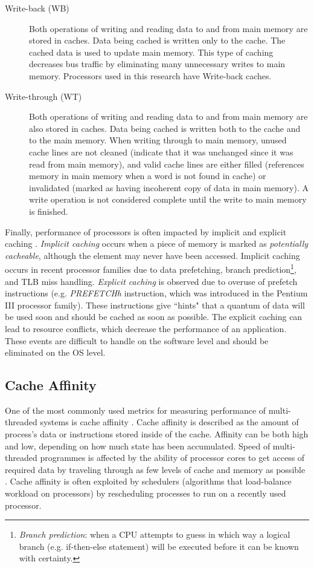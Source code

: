 \begin{description}
  \item[Write-back (WB)] Both operations of writing and reading data to and from main memory are stored in caches. Data being cached is written only to the cache. The cached data is used to update main memory. This type of caching decreases bus traffic by eliminating many unnecessary writes to main memory. Processors used in this research have Write-back caches.
  \item[Write-through (WT)] Both operations of writing and reading data to and from main memory are also stored in caches. Data being cached is written both to the cache and to the main memory. When writing through to main memory, unused cache lines are not cleaned (indicate that it was unchanged since it was read from main memory), and valid cache lines are either filled (references memory in main memory when a word is not found in cache) or invalidated (marked as having incoherent copy of data in main memory). A write operation is not considered complete until the write to main memory is finished.
\end{description}

Finally, performance of processors is often impacted by implicit and explicit caching \cite{Intel2014}. \textit{Implicit caching} occurs when a piece of memory is marked as \textit{potentially cacheable}, although the element may never have been accessed. Implicit caching occurs in recent processor families due to data prefetching, branch prediction\footnote{\textit{Branch prediction}: when a CPU attempts to guess in which way a logical branch (e.g. if-then-else statement) will be executed before it can be known with certainty.}, and TLB miss handling. \textit{Explicit caching} is observed due to overuse of prefetch instructions (e.g. \textit{PREFETCHh} instruction, which was introduced in the Pentium III processor family). These instructions give ``hints" that a quantum of data will be used soon and should be cached as soon as possible. The explicit caching can lead to resource conflicts, which decrease the performance of an application. These events are difficult to handle on the software level and should be eliminated on the OS level.

\subsection{Cache Affinity}

One of the most commonly used metrics for measuring performance of multi-threaded systems is cache affinity \cite{Torrellas1995,Squillante1993,Vaswani1991}. Cache affinity is described as the amount of process's data or instructions stored inside of the cache. Affinity can be both high and low, depending on how much state has been accumulated. Speed of multi-threaded programmes is affected by the ability of processor cores to get access of required data by traveling through as few levels of cache and memory as possible \cite{Kazempour2008}. Cache affinity is often exploited by schedulers (algorithms that load-balance workload on processors) by rescheduling processes to run on a recently used processor.

